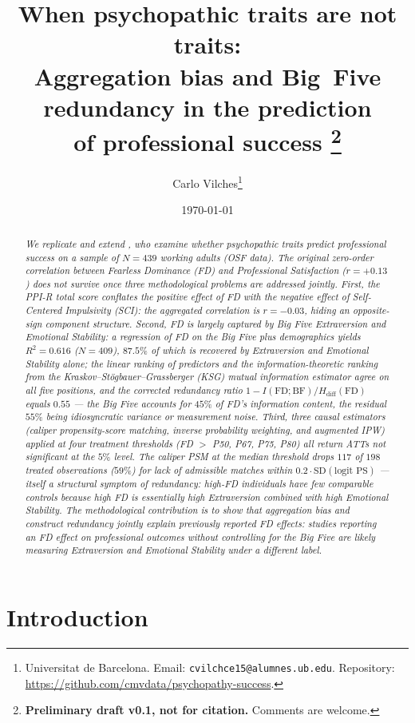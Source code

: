 \documentclass[11pt,a4paper]{article}
\title{When psychopathic traits are not traits: \\
Aggregation bias and {Big~Five} redundancy in the prediction \\
of professional success%
\thanks{\textbf{Preliminary draft v0.1, not for citation.}
Comments are welcome.}%
}
\author{%
Carlo Vilches\thanks{%
Universitat de Barcelona. Email: \texttt{cvilchce15@alumnes.ub.edu}.
Repository: \url{https://github.com/cmvdata/psychopathy-success}.%
}%
}
\date{\today}
\begin{document}
\maketitle

\begin{abstract}
\itshape
We replicate and extend \citet{eisenbarth2018}, who examine whether
psychopathic traits predict professional success on a sample of $N=439$
working adults (OSF data). The original zero-order correlation between
Fearless Dominance (FD) and Professional Satisfaction ($r=+0.13$) does
not survive once three methodological problems are addressed jointly.
First, the PPI-R total score conflates the positive effect of FD with
the negative effect of Self-Centered Impulsivity (SCI): the aggregated
correlation is $r=-0.03$, hiding an opposite-sign component structure.
Second, FD is largely captured by Big Five Extraversion and Emotional
Stability: a regression of FD on the Big Five plus demographics yields
$R^2 = 0.616$ ($N=409$), $87.5\%$ of which is recovered by Extraversion
and Emotional Stability alone; the linear ranking of predictors and the
information-theoretic ranking from the Kraskov--Stögbauer--Grassberger
(KSG) mutual information estimator agree on all five positions, and
the corrected redundancy ratio $1-I(\text{FD};\text{BF}) /
H_{\text{diff}}(\text{FD})$ equals $0.55$ --- the Big Five accounts for
$45\%$ of FD's information content, the residual $55\%$ being
idiosyncratic variance or measurement noise. Third, three causal
estimators (caliper propensity-score matching, inverse probability
weighting, and augmented IPW) applied at four treatment thresholds
(FD $>$ P50, P67, P75, P80) all return ATTs not significant at the
$5\%$ level. The caliper PSM at the median threshold drops $117$ of
$198$ treated observations ($59\%$) for lack of admissible matches
within $0.2 \cdot \text{SD}(\text{logit PS})$ --- itself a structural
symptom of redundancy: high-FD individuals have few comparable
controls because high FD is essentially high Extraversion combined
with high Emotional Stability. The methodological contribution is to
show that aggregation bias and construct redundancy jointly explain
previously reported FD effects: studies reporting an FD effect on
professional outcomes without controlling for the Big Five are likely
measuring Extraversion and Emotional Stability under a different label.
\end{abstract}

\section{Introduction}
\label{sec:intro}
\end{document}
